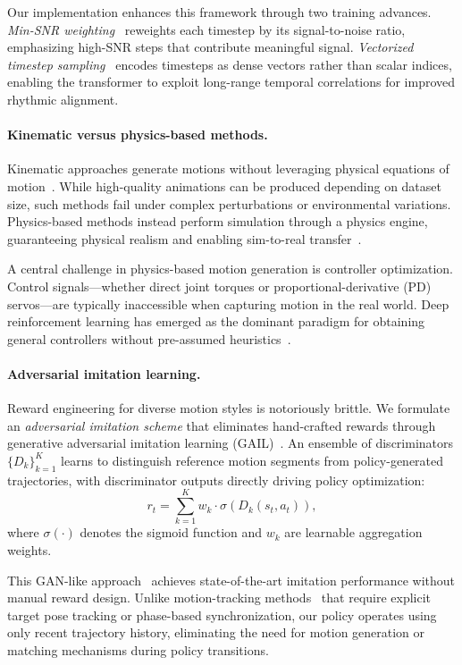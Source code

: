 Our implementation enhances this framework through two training advances. \emph{Min-SNR weighting}~\cite{minsnr2024} reweights each timestep by its signal-to-noise ratio, emphasizing high-SNR steps that contribute meaningful signal. \emph{Vectorized timestep sampling}~\cite{ptss2024} encodes timesteps as dense vectors rather than scalar indices, enabling the transformer to exploit long-range temporal correlations for improved rhythmic alignment.

\paragraph{Kinematic versus physics-based methods.}
Kinematic approaches generate motions without leveraging physical equations of motion~\cite{phasefunc2017, lmm2020}. While high-quality animations can be produced depending on dataset size, such methods fail under complex perturbations or environmental variations. Physics-based methods instead perform simulation through a physics engine, guaranteeing physical realism and enabling sim-to-real transfer~\cite{admlr2019, arlsia2020}.

A central challenge in physics-based motion generation is controller optimization. Control signals---whether direct joint torques or proportional-derivative (PD) servos---are typically inaccessible when capturing motion in the real world. Deep reinforcement learning has emerged as the dominant paradigm for obtaining general controllers without pre-assumed heuristics~\cite{pbmcidrl2018, deepmimic2018, scadiver2020}.

\paragraph{Adversarial imitation learning.}
Reward engineering for diverse motion styles is notoriously brittle. We formulate an \emph{adversarial imitation scheme} that eliminates hand-crafted rewards through generative adversarial imitation learning (GAIL)~\cite{gail2016, npmphc2019}. An ensemble of discriminators $\{D_k\}_{k=1}^K$ learns to distinguish reference motion segments from policy-generated trajectories, with discriminator outputs directly driving policy optimization:
\begin{equation*}
    r_t = \sum_{k=1}^{K} w_k \cdot \sigma(D_k(s_t, a_t)),
\end{equation*}
where $\sigma(\cdot)$ denotes the sigmoid function and $w_k$ are learnable aggregation weights.

This GAN-like approach~\cite{iccgan2021, deepmimic2018} achieves state-of-the-art imitation performance without manual reward design. Unlike motion-tracking methods~\cite{scadiver2020, ddrc2019} that require explicit target pose tracking or phase-based synchronization, our policy operates using only recent trajectory history, eliminating the need for motion generation or matching mechanisms during policy transitions.

